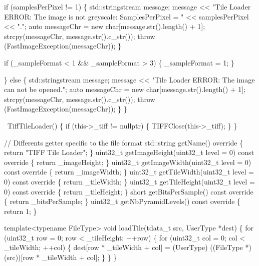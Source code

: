 \begin{DoxyCode}
      \textcolor{keywordflow}{if} (samplesPerPixel != 1) \{
        std::stringstream message;
        message << \textcolor{stringliteral}{"Tile Loader ERROR: The image is not greyscale: SamplesPerPixel = "} << samplesPerPixel
                << \textcolor{stringliteral}{"."};
        \textcolor{keyword}{auto} messageChr = \textcolor{keyword}{new} \textcolor{keywordtype}{char}[message.str().length() + 1];
        strcpy(messageChr, message.str().c\_str());
        \textcolor{keywordflow}{throw} (FastImageException(messageChr));
      \}

      \textcolor{keywordflow}{if} (\_sampleFormat < 1 && \_sampleFormat > 3) \{
        \_sampleFormat = 1;
      \}

    \} \textcolor{keywordflow}{else} \{
      std::stringstream message;
      message << \textcolor{stringliteral}{"Tile Loader ERROR: The image can not be opened."};
      \textcolor{keyword}{auto} messageChr = \textcolor{keyword}{new} \textcolor{keywordtype}{char}[message.str().length() + 1];
      strcpy(messageChr, message.str().c\_str());
      \textcolor{keywordflow}{throw} (FastImageException(messageChr));
    \}
  \}

  ~TiffTileLoader() \{
    \textcolor{keywordflow}{if} (this->\_tiff != \textcolor{keyword}{nullptr}) \{
      TIFFClose(this->\_tiff);
    \}
  \}

  \textcolor{comment}{// Differents getter specific to the file format}
  std::string getName()\textcolor{keyword}{ override }\{ \textcolor{keywordflow}{return} \textcolor{stringliteral}{"TIFF Tile Loader"}; \}
  uint32\_t getImageHeight(uint32\_t level = 0)\textcolor{keyword}{ const override }\{ \textcolor{keywordflow}{return} \_imageHeight; \}
  uint32\_t getImageWidth(uint32\_t level = 0)\textcolor{keyword}{ const override }\{ \textcolor{keywordflow}{return} \_imageWidth; \}
  uint32\_t getTileWidth(uint32\_t level = 0)\textcolor{keyword}{ const override }\{ \textcolor{keywordflow}{return} \_tileWidth; \}
  uint32\_t getTileHeight(uint32\_t level = 0)\textcolor{keyword}{ const override }\{ \textcolor{keywordflow}{return} \_tileHeight; \}
  \textcolor{keywordtype}{short} getBitsPerSample()\textcolor{keyword}{ const override }\{ \textcolor{keywordflow}{return} \_bitsPerSample; \}
  uint32\_t getNbPyramidLevels()\textcolor{keyword}{ const override }\{ \textcolor{keywordflow}{return} 1; \}

  \textcolor{keyword}{template}<\textcolor{keyword}{typename} FileType>
  \textcolor{keywordtype}{void} loadTile(tdata\_t src, UserType *dest) \{
    \textcolor{keywordflow}{for} (uint32\_t row = 0; row < \_tileHeight; ++row) \{
      \textcolor{keywordflow}{for} (uint32\_t col = 0; col < \_tileWidth; ++col) \{
        dest[row * \_tileWidth + col] = (UserType) ((FileType *) (src))[row * \_tileWidth + col];
      \}
    \}
  \}


\end{DoxyCode}
